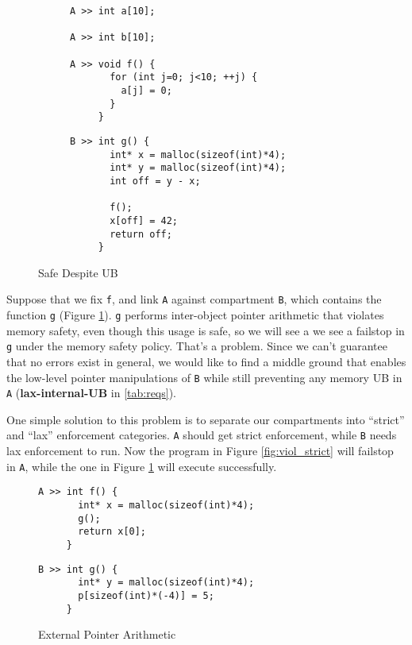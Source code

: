 \documentclass{article}
\begin{document}
\begin{figure}
  \begin{subfigure}{\textwidth}
    \begin{minipage}[t]{0.5\textwidth}
\begin{verbatim}
A >> int a[10];

A >> int b[10];

A >> void f() {
       for (int j=0; j<10; ++j) {
         a[j] = 0;
       }
     }
\end{verbatim}
    \end{minipage}
    \begin{minipage}[t]{0.4\textwidth}
\begin{verbatim}
B >> int g() {
       int* x = malloc(sizeof(int)*4);
       int* y = malloc(sizeof(int)*4);
       int off = y - x;

       f();
       x[off] = 42;
       return off;
     }
\end{verbatim}
    \end{minipage}
  \end{subfigure}

  \caption{Safe Despite UB}
  \label{fig:safe_internal}
\end{figure}
  
Suppose that we fix {\tt f}, and link {\tt A} against compartment {\tt B}, which contains
the function {\tt g} (Figure \ref{fig:safe_internal}). {\tt g} performs
inter-object pointer arithmetic that
violates memory safety, even though this usage is safe, so we will see a 
we see a failstop in {\tt g} under the memory safety policy. That's a problem.
Since we can't guarantee that no errors exist in general, we would like to find a
middle ground that enables the low-level pointer manipulations of {\tt B} while still
preventing any memory UB in {\tt A} ({\bf lax-internal-UB} in \ref{tab:reqs}).

One simple solution to this problem is to separate our compartments into ``strict''
and ``lax'' enforcement categories. {\tt A} should get strict enforcement, while
{\tt B} needs lax enforcement to run. Now the program in Figure \ref{fig:viol_strict}
will failstop in {\tt A}, while the one in Figure \ref{fig:safe_internal} will execute
successfully.

\begin{figure}
  \begin{minipage}[t]{0.5\textwidth}
\begin{verbatim}
A >> int f() {
       int* x = malloc(sizeof(int)*4);
       g();
       return x[0];
     }
\end{verbatim}
  \end{minipage}
  \begin{minipage}[t]{0.4\textwidth}
\begin{verbatim}
B >> int g() {
       int* y = malloc(sizeof(int)*4);
       p[sizeof(int)*(-4)] = 5;
     }
\end{verbatim}
  \end{minipage}
  
  \caption{External Pointer Arithmetic}
  \label{fig:viol_extern}
\end{figure}
\end{document}
